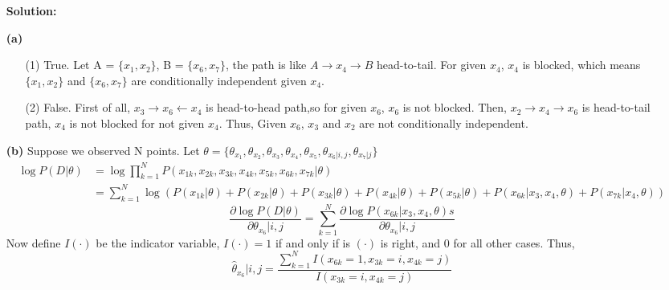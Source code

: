 \documentclass[10pt]{article}
\begin{document}
\begin{enumerate}
\textbf{Solution:}
    \item[\textbf{(a)}]
      \begin{enumerate}
        \item[{(1)}]True.
        Let A = $\{x_1,x_2 \}$, B = $\{x_6,x_7 \}$,
        the path is like $A\rightarrow x_4 \rightarrow B$ head-to-tail.
        For given $x_4$, $x_4$ is blocked, which means $ \{x_1, x_2\} $ and $ \{x_6, x_7\} $ are conditionally independent given $x_4$.
        \item[{(2)}] False. First of all, $x_3\rightarrow x_6 \leftarrow x_4$ is head-to-head path,so for given $x_6$, $x_6$ is not blocked.
        Then, $x_2 \rightarrow x_4 \rightarrow x_6$ is head-to-tail path, $x_4$ is not blocked for not given $x_4$.
        Thus, Given $x_6$, $ x_3 $ and $ x_2 $ are not conditionally independent.
      \end{enumerate}
    \item[\textbf{(b)}]
      Suppose we observed N points.
      Let $\theta = \{\theta_{x_1}, \theta_{x_2}, \theta_{x_3}, \theta_{x_4}, \theta_{x_5}, \theta_{x_6|i,j}, \theta_{x_7|j} \}$
      $$
      \begin{aligned}
          \log P(D|\theta) &= \log \prod_{k=1}^N P(x_{1k},x_{2k},x_{3k},x_{4k},x_{5k},x_{6k},x_{7k}|\theta)
          \\&= \sum_{k=1}^N \log  (P(x_{1k}|\theta)+ P(x_{2k}|\theta)+ P(x_{3k}|\theta)+ P(x_{4k}|\theta)+ 
          P(x_{5k}|\theta)+ P(x_{6k}|x_3,x_4,\theta)+ P(x_{7k}|x_4,\theta))
      \end{aligned}
      $$
      $$\frac{\partial \log P(D|\theta)}{\partial \theta_{x_6}|i,j} = \sum_{k=1}^N \frac{\partial \log P(x_{6k}|x_3,x_4,\theta)s}{\partial \theta_{x_6}|i,j}$$
      Now define $I(\cdot)$ be the indicator variable, $I(\cdot)=1$ if and only if is $(\cdot)$ is right, and 0 for all other cases.
      Thus,
      $$\hat{\theta}_{x_6}|i,j = \frac{\sum_{k=1}^N I(x_{6k} = 1,x_{3k}=i,x_{4k}=j)}{I(x_{3k}=i,x_{4k}=j)}$$

    \end{enumerate}
\end{document}

